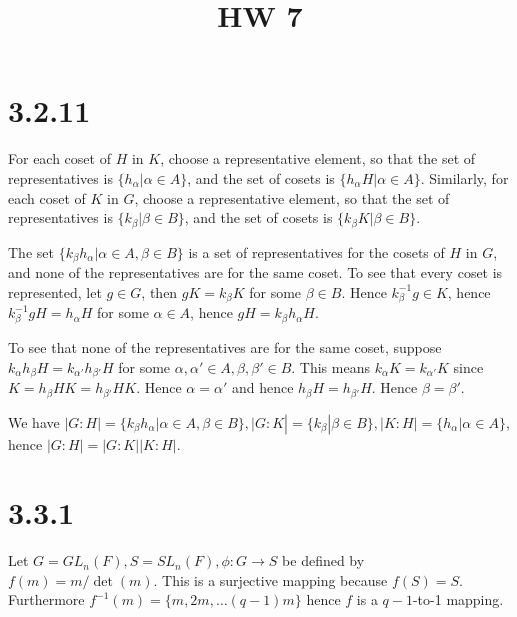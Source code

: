 \documentclass{article}
\title{HW 7}
\date{}
\def\inv{{-1}}
\begin{document}
\maketitle





\section*{3.2.11}

For each coset of $H$ in $K$, choose a representative element, so that the set of representatives is $\{ h_\alpha | \alpha \in A \}$, and the set of cosets is $\{ h_\alpha H | \alpha \in A \}$. Similarly, for each coset of $K$ in $G$, choose a representative element, so that the set of representatives is $\{ k_\beta | \beta \in B \}$, and the set of cosets is $\{ k_\beta K | \beta \in B \}$.

The set $\{ k_\beta h_\alpha | \alpha \in A, \beta \in B \}$ is a set of representatives for the cosets of $H$ in $G$, and none of the representatives are for the same coset. To see that every coset is represented, let $g \in G$, then $g K = k_\beta K$ for some $\beta \in B$. Hence $k_\beta^\inv g \in K$, hence $k_\beta^\inv g H = h_\alpha H$ for some $\alpha \in A$, hence $gH =k_\beta h_\alpha H$.

To see that none of the representatives are for the same coset, suppose $k_\alpha h_\beta H = k_{\alpha'} h_{\beta'} H$ for some $\alpha, \alpha' \in A, \beta, \beta' \in B$. This means $k_\alpha K = k_{\alpha'} K$ since $K = h_\beta H K = h_{\beta'} H K$. Hence $\alpha = \alpha'$ and hence $h_\beta H = h_{\beta'} H$. Hence $\beta = \beta'$.

We have $|G : H| = \{ k_\beta h_\alpha | \alpha \in A, \beta \in B \}, |G : K| = \{ k_\beta | \beta \in B \}, |K : H| = \{ h_\alpha | \alpha \in A \}$, hence $|G : H| = |G : K| |K : H|$.

\section*{3.3.1}

Let $G = GL_n(F), S = SL_n(F), \phi : G \to S$ be defined by $f(m) = m / \det(m)$. This is a surjective mapping because $f(S) = S$. Furthermore $f^\inv(m) = \{m, 2m, \ldots (q-1)m\}$ hence $f$ is a $q-1$-to-1 mapping. 
\end{document}
